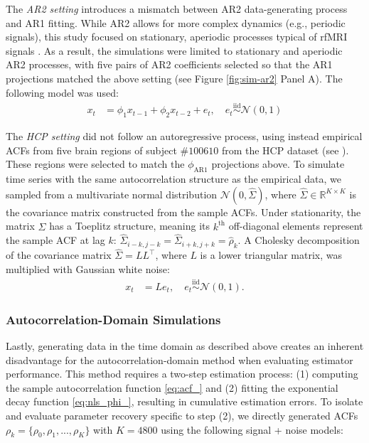 \documentclass[latex/main.tex]{subfiles}
\begin{document}
The \textit{AR2 setting} introduces a mismatch between AR2 data-generating process and AR1 fitting. While AR2 allows for more complex dynamics (e.g., periodic signals), this study focused on stationary, aperiodic processes typical of rfMRI signals \citep{he_scale-free_2011}. As a result, the simulations were limited to stationary and aperiodic AR2 processes, with five pairs of AR2 coefficients selected so that the AR1 projections matched the above setting (see Figure \ref{fig:sim-ar2} Panel A). The following model was used:
\begin{align}
    x_t &= \phi_1 x_{t-1} + \phi_2 x_{t-2} + e_t, \quad e_t \overset{\text{iid}}{\sim} \mathcal{N}(0, 1)
\end{align}

The \textit{HCP setting} did not follow an autoregressive process, using instead empirical ACFs from five brain regions of subject $\#100610$ from the HCP dataset (see ). These regions were selected to match the $\phi_\text{AR1}$ projections above. To simulate time series with the same autocorrelation structure as the empirical data, we sampled from a multivariate normal distribution $\mathcal{N}(0, \hat\Sigma)$, where $\hat\Sigma \in \mathbb{R}^{K\times K}$ is the covariance matrix constructed from the sample ACFs. Under stationarity, the matrix $\hat\Sigma$ has a Toeplitz structure, meaning its $k^\text{th}$ off-diagonal elements represent the sample ACF at lag $k$: $\hat\Sigma_{i-k, j-k} = \hat\Sigma_{i+k, j+k} = \hat\rho_k$. A Cholesky decomposition of the covariance matrix $\hat\Sigma = LL^{\top}$, where $L$ is a lower triangular matrix, was multiplied with Gaussian white noise:
\begin{align}
    x_t &= L e_t, \quad e_t \overset{\text{iid}}{\sim} \mathcal{N}(0, 1).
\end{align}

\subsubsection{Autocorrelation-Domain Simulations}
Lastly, generating data in the time domain as described above creates an inherent disadvantage for the autocorrelation-domain method when evaluating estimator performance. This method requires a two-step estimation process: (1) computing the sample autocorrelation function \eqref{eq:acf_} and (2) fitting the exponential decay function \eqref{eq:nls_phi_}, resulting in cumulative estimation errors. To isolate and evaluate parameter recovery specific to step (2), we directly generated ACFs $\rho_k = \{\rho_0, \rho_1, ..., \rho_K\}$ with $K=4800$ using the following signal + noise models:
\end{document}
